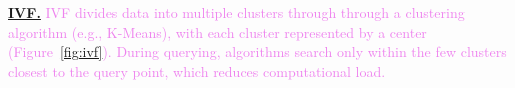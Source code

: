 \documentclass[sigconf, nonacm]{acmart}
\begin{document}
{%
%	
%	
	
	
	\noindent\textbf{\underline{IVF.}} 
	\textcolor{violet}{IVF divides data into multiple clusters through through a clustering algorithm (e.g., K-Means), with each cluster represented by a center (Figure~\ref{fig:ivf}). During querying, algorithms search only within the few clusters closest to the query point, which reduces computational load.}
	
}
\end{document}
